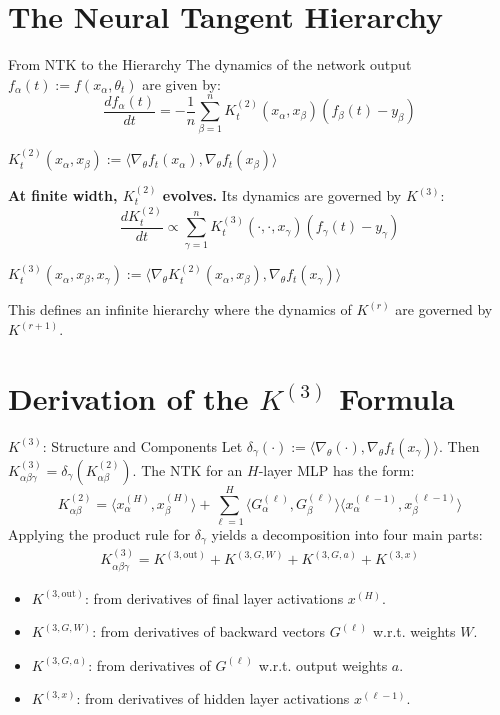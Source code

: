 \documentclass{beamer}
\begin{document}
\section{The Neural Tangent Hierarchy}

\begin{frame}{From NTK to the Hierarchy}
The dynamics of the network output $f_\alpha(t) := f(x_\alpha, \theta_t)$ are given by:
\[
\frac{d f_\alpha(t)}{dt} = -\frac{1}{n} \sum_{\beta=1}^n K^{(2)}_t(x_\alpha, x_\beta) (f_\beta(t) - y_\beta)
\]
\begin{definition}
$K^{(2)}_t(x_\alpha, x_\beta) := \langle \nabla_\theta f_t(x_\alpha), \nabla_\theta f_t(x_\beta) \rangle$
\end{definition}
\vspace{0.5cm}
\textbf{At finite width, $K^{(2)}_t$ evolves.} Its dynamics are governed by $K^{(3)}$:
\[
\frac{d K^{(2)}_t}{dt} \propto \sum_{\gamma=1}^n K^{(3)}_t(\cdot, \cdot, x_\gamma) (f_\gamma(t) - y_\gamma)
\]
\begin{definition}
$K^{(3)}_t(x_\alpha, x_\beta, x_\gamma) := \langle \nabla_\theta K^{(2)}_t(x_\alpha, x_\beta), \nabla_\theta f_t(x_\gamma) \rangle$
\end{definition}
This defines an infinite hierarchy where the dynamics of $K^{(r)}$ are governed by $K^{(r+1)}$.
\end{frame}


\section{Derivation of the $K^{(3)}$ Formula}

\begin{frame}{$K^{(3)}$: Structure and Components}
Let $\delta_\gamma(\cdot) := \langle \nabla_\theta (\cdot), \nabla_\theta f_t(x_\gamma) \rangle$. Then $K^{(3)}_{\alpha\beta\gamma} = \delta_\gamma(K^{(2)}_{\alpha\beta})$.
\vspace{0.5cm}
The NTK for an $H$-layer MLP has the form:
\[
K^{(2)}_{\alpha\beta} = \langle x^{(H)}_\alpha, x^{(H)}_\beta \rangle + \sum_{\ell=1}^{H} \langle G^{(\ell)}_\alpha, G^{(\ell)}_\beta \rangle \langle x^{(\ell-1)}_\alpha, x^{(\ell-1)}_\beta \rangle
\]
Applying the product rule for $\delta_\gamma$ yields a decomposition into four main parts:
\begin{align*}
K^{(3)}_{\alpha\beta\gamma} = K^{(3,\text{out})} + K^{(3,G,W)} + K^{(3,G,a)} + K^{(3,x)}
\end{align*}
\begin{itemize}
    \item $K^{(3,\text{out})}$: from derivatives of final layer activations $x^{(H)}$.
    \item $K^{(3,G,W)}$: from derivatives of backward vectors $G^{(\ell)}$ w.r.t. weights $W$.
    \item $K^{(3,G,a)}$: from derivatives of $G^{(\ell)}$ w.r.t. output weights $a$.
    \item $K^{(3,x)}$: from derivatives of hidden layer activations $x^{(\ell-1)}$.
\end{itemize}
\end{frame}
\end{document}
